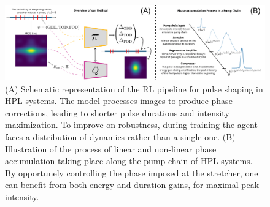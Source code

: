 \begin{figure}
    \centering
    \includegraphics[width=\linewidth]{images/Figure1_and_CPA_edit_lowres.png}
    \caption{(A) Schematic representation of the RL pipeline for pulse shaping in HPL systems. The model processes images to produce phase corrections, leading to shorter pulse durations and intensity maximization. To improve on robustness, during training the agent faces a distribution of dynamics rather than a single one. (B) Illustration of the process of linear and non-linear phase accumulation taking place along the pump-chain of HPL systems. By opportunely controlling the phase imposed at the stretcher, one can benefit from both energy and duration gains, for maximal peak intensity.}
    \label{fig:figure1_and_cpa}
\end{figure}

